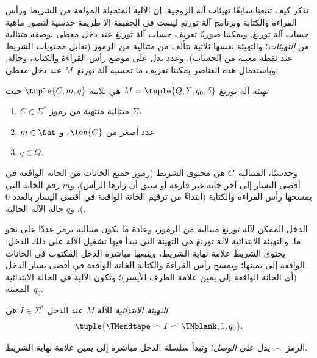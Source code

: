\documentclass[../../../include/open-logic-section]{subfiles}
\begin{document}

\begin{explain}
تذكر كيف تتبعنا سابقًا تهيئات آلة الزوجية. إن الآلية المتخيلة المؤلفة
من الشريط ورأس القراءة والكتابة وبرنامج آلة تورنغ ليست في الحقيقة إلا
طريقة حدسية لتصور ماهية حساب آلة تورنغ. ويمكننا صوريًا تعريف حساب آلة
تورنغ عند دخل معطى بوصفه متتالية من \emph{التهيئات}؛ والتهيئة نفسها
ثلاثية تتألف من متتالية من الرموز (تقابل محتويات الشريط عند نقطة معينة
من الحساب)، وعدد يدل على موضع رأس القراءة والكتابة، وحالة. وباستعمال هذه العناصر
يمكننا تعريف ما تحسبه آلة تورنغ~$M$ عند دخل معطى.
\end{explain}

\begin{defn}[التهيئة]
\emph{تهيئة} آلة تورنغ $M=\tuple{Q,\Sigma,q_0,\delta}$ هي ثلاثية
$\tuple{C,m,q}$ حيث
\begin{enumerate}
\item $C \in \Sigma^*$ متتالية منتهية من رموز $\Sigma$،
\item $m \in \Nat$ عدد أصغر من $\len{C}$، و
\item $q \in Q$.
\end{enumerate}
وحدسيًا، المتتالية~$C$ هي محتوى الشريط (رموز جميع الخانات من الخانة
الواقعة في أقصى اليسار إلى آخر خانة غير فارغة أو سبق أن زارها الرأس)،
و$m$ رقم الخانة التي يمسحها رأس القراءة والكتابة (ابتداءً من ترقيم
الخانة الواقعة في أقصى اليسار بالعدد $0$)، و$q$ حالة الآلة الحالية.
\end{defn}

\begin{explain}
الدخل الممكن لآلة تورنغ متتالية من الرموز، وعادة ما تكون متتالية ترمز
عددًا على نحو ما. والتهيئة الابتدائية لآلة تورنغ هي التهيئة التي نبدأ
فيها تشغيل الآلة على ذلك الدخل: يحتوي الشريط علامة نهاية الشريط،
ويتبعها مباشرة الدخل المكتوب في الخانات الواقعة إلى يمينها؛ ويمسح
رأس القراءة والكتابة الخانة الواقعة في أقصى يسار الدخل (أي الخانة
الواقعة إلى يمين علامة الطرف الأيسر)؛ وتكون الآلية في الحالة
الابتدائية المعينة~$q_0$.
\end{explain}

\begin{defn}
\emph{التهيئة الابتدائية} للآلة $M$ عند الدخل $I \in \Sigma^*$ هي
\[
\tuple{\TMendtape \frown I \frown \TMblank, 1, q_0}.
\]
\end{defn}

\begin{explain}
الرمز~$\frown$ يدل على \emph{الوصل}؛ وتبدأ سلسلة الدخل مباشرة إلى
يمين علامة نهاية الشريط.
\end{explain}
\end{document}
